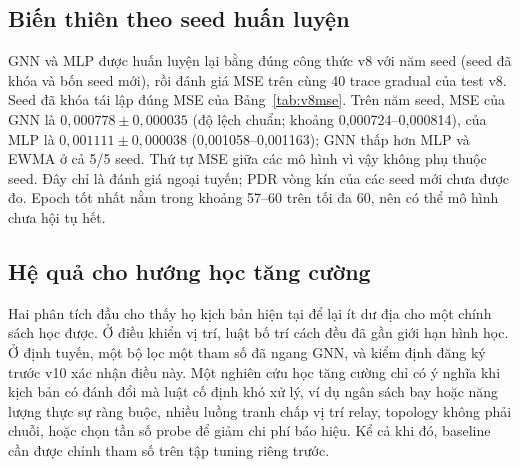 \subsection{Biến thiên theo seed huấn luyện}
GNN và MLP được huấn luyện lại bằng đúng công thức v8 với năm seed (seed đã khóa và bốn seed mới), rồi đánh giá MSE trên cùng 40 trace  gradual của test v8. Seed đã khóa tái lập đúng MSE của Bảng~\ref{tab:v8mse}. Trên năm seed, MSE của GNN là $0{,}000778\pm0{,}000035$ (độ lệch chuẩn; khoảng 0,000724--0,000814), của MLP là $0{,}001111\pm0{,}000038$ (0,001058--0,001163); GNN thấp hơn MLP và EWMA ở cả 5/5 seed. Thứ tự MSE giữa các mô hình vì vậy không phụ thuộc seed. Đây chỉ là đánh giá ngoại tuyến; PDR vòng kín của các seed mới chưa được đo. Epoch tốt nhất nằm trong khoảng 57--60 trên tối đa 60, nên có thể mô hình chưa hội tụ hết.

\subsection{Hệ quả cho hướng học tăng cường}
Hai phân tích đầu cho thấy họ kịch bản hiện tại để lại ít dư địa cho một chính sách học được. Ở điều khiển vị trí, luật bố trí cách đều đã gần giới hạn hình học. Ở định tuyến, một bộ lọc một tham số đã ngang GNN, và kiểm định đăng ký trước v10 xác nhận điều này. Một nghiên cứu học tăng cường chỉ có ý nghĩa khi kịch bản có đánh đổi mà luật cố định khó xử lý, ví dụ ngân sách bay hoặc năng lượng thực sự ràng buộc, nhiều luồng tranh chấp vị trí relay, topology không phải chuỗi, hoặc chọn tần số probe để giảm chi phí báo hiệu. Kể cả khi đó, baseline cần được chỉnh tham số trên tập tuning riêng trước.
